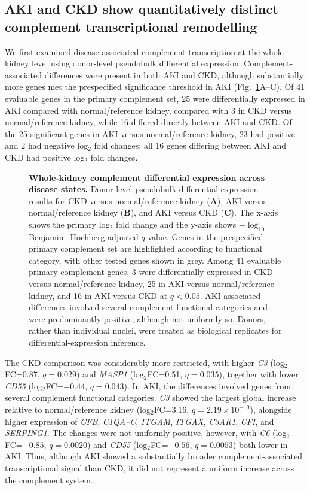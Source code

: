 \documentclass[10pt,letterpaper]{article}
\begin{document}
\subsection*{AKI and CKD show quantitatively distinct complement transcriptional remodelling}

We first examined disease-associated complement transcription at the whole-kidney level using donor-level pseudobulk differential expression. Complement-associated differences were present in both AKI and CKD, although substantially more genes met the prespecified significance threshold in AKI (Fig.~\ref{fig:global_de}A--C). Of 41 evaluable genes in the primary complement set, 25 were differentially expressed in AKI compared with normal/reference kidney, compared with 3 in CKD versus normal/reference kidney, while 16 differed directly between AKI and CKD. Of the 25 significant genes in AKI versus normal/reference kidney, 23 had positive and 2 had negative log$_2$ fold changes; all 16 genes differing between AKI and CKD had positive log$_2$ fold changes.

\begin{figure}[!h]
\caption{\textbf{Whole-kidney complement differential expression across disease states.}
Donor-level pseudobulk differential-expression results for CKD versus normal/reference kidney (\textbf{A}), AKI versus normal/reference kidney (\textbf{B}), and AKI versus CKD (\textbf{C}). The x-axis shows the primary log$_2$ fold change and the y-axis shows $-\log_{10}$ Benjamini--Hochberg-adjusted $q$-value. Genes in the prespecified primary complement set are highlighted according to functional category, with other tested genes shown in grey. Among 41 evaluable primary complement genes, 3 were differentially expressed in CKD versus normal/reference kidney, 25 in AKI versus normal/reference kidney, and 16 in AKI versus CKD at $q<0.05$. AKI-associated differences involved several complement functional categories and were predominantly positive, although not uniformly so. Donors, rather than individual nuclei, were treated as biological replicates for differential-expression inference.}
\label{fig:global_de}
\end{figure}


The CKD comparison was considerably more restricted, with higher \textit{C3} (log$_2$FC=0.87, $q=0.029$) and \textit{MASP1} (log$_2$FC=0.51, $q=0.035$), together with lower \textit{CD55} (log$_2$FC=$-0.44$, $q=0.043$). In AKI, the differences involved genes from several complement functional categories. \textit{C3} showed the largest global increase relative to normal/reference kidney (log$_2$FC=3.16, $q=2.19\times10^{-19}$), alongside higher expression of \textit{CFB}, \textit{C1QA--C}, \textit{ITGAM}, \textit{ITGAX}, \textit{C3AR1}, \textit{CFI}, and \textit{SERPING1}. The changes were not uniformly positive, however, with \textit{C6} (log$_2$FC=$-0.85$, $q=0.0020$) and \textit{CD55} (log$_2$FC=$-0.56$, $q=0.0053$) both lower in AKI. Thus, although AKI showed a substantially broader complement-associated transcriptional signal than CKD, it did not represent a uniform increase across the complement system.
\end{document}
